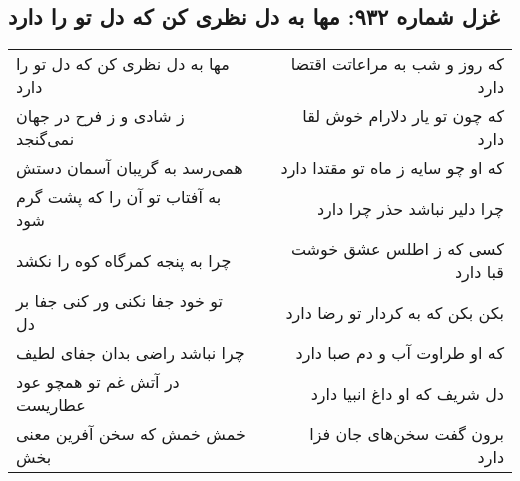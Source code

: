 \begin{center}
\section*{غزل شماره ۹۳۲: مها به دل نظری کن که دل تو را دارد}
\label{sec:0932}
\begin{longtable}{l p{0.5cm} r}
مها به دل نظری کن که دل تو را دارد
&&
که روز و شب به مراعاتت اقتضا دارد
\\
ز شادی و ز فرح در جهان نمی‌گنجد
&&
که چون تو یار دلارام خوش لقا دارد
\\
همی‌رسد به گریبان آسمان دستش
&&
که او چو سایه ز ماه تو مقتدا دارد
\\
به آفتاب تو آن را که پشت گرم شود
&&
چرا دلیر نباشد حذر چرا دارد
\\
چرا به پنجه کمرگاه کوه را نکشد
&&
کسی که ز اطلس عشق خوشت قبا دارد
\\
تو خود جفا نکنی ور کنی جفا بر دل
&&
بکن بکن که به کردار تو رضا دارد
\\
چرا نباشد راضی بدان جفای لطیف
&&
که او طراوت آب و دم صبا دارد
\\
در آتش غم تو همچو عود عطاریست
&&
دل شریف که او داغ انبیا دارد
\\
خمش خمش که سخن آفرین معنی بخش
&&
برون گفت سخن‌های جان فزا دارد
\\
\end{longtable}
\end{center}
